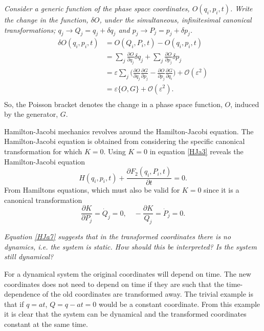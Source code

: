 \begin{example}
	\emph{Consider a generic function of the phase space coordinates, $O(q_i,p_i,t)$. Write the change in the function, $\delta O$, under the simultaneous, infinitesimal canonical transformations; $q_j\rightarrow Q_j=q_j+\delta q_j$ and $p_j\rightarrow P_j=p_j+\delta p_j$.}
	\begin{equation}
		\begin{split}
			\delta O(q_i,p_i,t)&=O(Q_i,P_i,t)-O(q_i,p_i,t)\\
			&=\sum_j\frac{\partial O}{\partial q_j}\delta q_j+\sum_j\frac{\partial O}{\partial p_j}\delta p_j\\
			&=\varepsilon\sum_j\bigg(\frac{\partial O}{\partial q_j}\frac{\partial G}{\partial p_j}-\frac{\partial O}{\partial p_j} \frac{\partial G}{\partial q_i}\bigg)+\mathcal{O}(\varepsilon^2)\\
			&=\varepsilon\{O,G\}+\mathcal{O}(\varepsilon^2).\\
		\end{split}
	\end{equation} 
	\noindent So, the Poisson bracket denotes the change in a phase space function, $O$, induced by the generator, $G$.
	
\end{example}
Hamilton-Jacobi mechanics revolves around the Hamilton-Jacobi equation. The Hamilton-Jacobi equation is obtained from considering the specific canonical transformation for which $K=0$. Using $K=0$ in equation \eqref{HJa3} reveals the Hamilton-Jacobi equation
\begin{equation}
	H(q_i,p_i,t)+\frac{\partial F_2(q_i,P_i,t)}{\partial t}=0.
	\label{HJeq}
\end{equation} 
From Hamiltons equations, which must also be valid for $K=0$ since it is a canonical transformation
\begin{equation}
	\frac{\partial K}{\partial P_j}=\dot{Q}_j=0, \quad -\frac{\partial K}{Q_j}=\dot{P}_j=0.
	\label{HJa7}
\end{equation} 
\begin{example}
	\emph{Equation \eqref{HJa7} suggests that in the transformed coordinates there is no dynamics, i.e. the system is static. How should this be interpreted? Is the system still dynamical?}\newline 
	
	For a dynamical system the original coordinates will depend on time. The new coordinates does not need to depend on time if they are such that the time-dependence of the old coordinates are transformed away. The trivial example is that if $q=at$, $Q=q-at=0$ would be a constant coordinate. From this example it is clear that the system can be dynamical and the transformed coordinates constant at the same time.
\end{example} 

